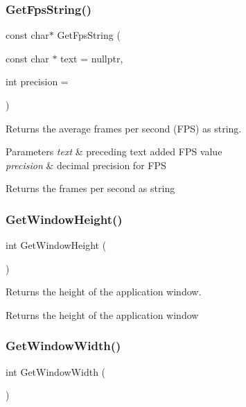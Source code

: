 \subsubsection{\texorpdfstring{Get\+Fps\+String()}{GetFpsString()}}
{\footnotesize\ttfamily const char$\ast$ Get\+Fps\+String (\begin{DoxyParamCaption}\item[{const char $\ast$}]{text = {\ttfamily nullptr},  }\item[{int}]{precision = {} }\end{DoxyParamCaption})}

Returns the average frames per second (F\+PS) as string.


\begin{DoxyParams}{Parameters}
{\em text} & preceding text added F\+PS value \\
\hline
{\em precision} & decimal precision for F\+PS \\
\hline
\end{DoxyParams}
\begin{DoxyReturn}{Returns}
the frames per second as string 
\end{DoxyReturn}
\mbox{\label{group__sdl__group_gac27ddd893a70056c55278b33d7bd2c62}} 
\subsubsection{\texorpdfstring{Get\+Window\+Height()}{GetWindowHeight()}}
{\footnotesize\ttfamily int Get\+Window\+Height (\begin{DoxyParamCaption}{ }\end{DoxyParamCaption})}

Returns the height of the application window.

\begin{DoxyReturn}{Returns}
the height of the application window 
\end{DoxyReturn}
\mbox{\label{group__sdl__group_gaa938d3f784d26ccd4ed8c2d83bbc6ab4}} 
\subsubsection{\texorpdfstring{Get\+Window\+Width()}{GetWindowWidth()}}
{\footnotesize\ttfamily int Get\+Window\+Width (\begin{DoxyParamCaption}{ }\end{DoxyParamCaption})}

